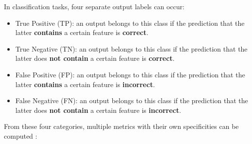 \setlength{\marginparwidth}{3cm}\leavevmode {}In classification tasks, four separate output labels can occur:
\begin{itemize}
\item True Positive (TP):  an output belongs to this class if the prediction that the latter \textbf{contains} a certain feature is \textbf{correct}.
\item True Negative (TN): an output belongs to this class if the prediction that the latter does \textbf{not contain} a certain feature is \textbf{correct}.
\item False Positive (FP): an output belongs to this class if the prediction that the latter \textbf{contains} a certain feature is \textbf{incorrect}.
\item False Negative (FN): an output belongs to this class if the prediction that the latter does \textbf{not contain} a certain feature is \textbf{incorrect}.
\end{itemize}
From these four categories, multiple metrics with their own specificities can be computed \cite{25}:
